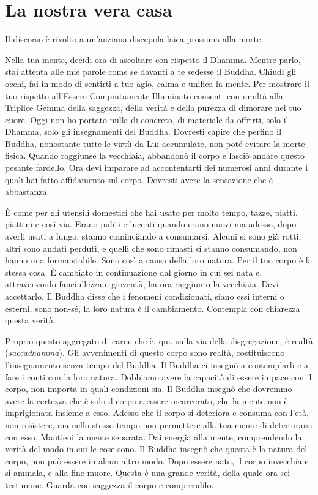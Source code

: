 \chapter{La nostra vera casa}

\begin{openingQuote}
  \centering

  Il discorso è rivolto a un'anziana discepola laica prossima alla morte.
\end{openingQuote}

Nella tua mente, decidi ora di ascoltare con rispetto il Dhamma. Mentre
parlo, stai attenta alle mie parole come se davanti a te sedesse il
Buddha. Chiudi gli occhi, fai in modo di sentirti a tuo agio, calma e
unifica la mente. Per mostrare il tuo rispetto all'Essere Compiutamente
Illuminato consenti con umiltà alla Triplice Gemma della saggezza, della
verità e della purezza di dimorare nel tuo cuore. Oggi non ho portato
nulla di concreto, di materiale da offrirti, solo il Dhamma, solo gli
insegnamenti del Buddha. Dovresti capire che perfino il Buddha,
nonostante tutte le virtù da Lui accumulate, non poté evitare la morte
fisica. Quando raggiunse la vecchiaia, abbandonò il corpo e lasciò
andare questo pesante fardello. Ora devi imparare ad accontentarti dei
numerosi anni durante i quali hai fatto affidamento sul corpo. Dovresti
avere la sensazione che è abbastanza.

È come per gli utensili domestici che hai usato per molto tempo, tazze,
piatti, piattini e così via. Erano puliti e lucenti quando erano nuovi
ma adesso, dopo averli usati a lungo, stanno cominciando a consumarsi.
Alcuni si sono già rotti, altri sono andati perduti, e quelli che sono
rimasti si stanno consumando, non hanno una forma stabile. Sono così a
causa della loro natura. Per il tuo corpo è la stessa cosa. È cambiato
in continuazione dal giorno in cui sei nata e, attraversando
fanciullezza e gioventù, ha ora raggiunto la vecchiaia. Devi accettarlo.
Il Buddha disse che i fenomeni condizionati, siano essi interni o
esterni, sono non-sé, la loro natura è il cambiamento. Contempla con
chiarezza questa verità.

Proprio questo aggregato di carne che è, qui, sulla via della
disgregazione, è realtà (\emph{saccadhamma}). Gli avvenimenti di questo
corpo sono realtà, costituiscono l'insegnamento senza tempo del Buddha.
Il Buddha ci insegnò a contemplarli e a fare i conti con la loro natura.
Dobbiamo avere la capacità di essere in pace con il corpo, non importa
in quali condizioni sia. Il Buddha insegnò che dovremmo avere la
certezza che è solo il corpo a essere incarcerato, che la mente non è
imprigionata insieme a esso. Adesso che il corpo si deteriora e consuma
con l'età, non resistere, ma nello stesso tempo non permettere alla tua
mente di deteriorarsi con esso. Mantieni la mente separata. Dai energia
alla mente, comprendendo la verità del modo in cui le cose sono. Il
Buddha insegnò che questa è la natura del corpo, non può essere in alcun
altro modo. Dopo essere nato, il corpo invecchia e si ammala, e alla
fine muore. Questa è una grande verità, della quale ora sei testimone.
Guarda con saggezza il corpo e comprendilo.

